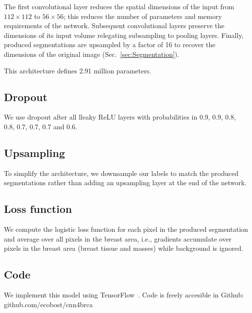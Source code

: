 	The first convolutional layer reduces the spatial dimensions of the input from $112 \times 112$ to $56 \times 56$; this reduces the number of parameters and memory requirements of the network. Subsequent convolutional layers preserve the dimensions of its input volume relegating subsampling to pooling layers. 
Finally, produced segmentations are upsampled by a factor of 16 to recover the dimensions of the original image (Sec.~\ref{sec:Segmentation}).

This architecture defines 2.91 million parameters. %



\subsection{Dropout}
We use dropout after all lleaky ReLU layers with probabilities in 0.9, 0.9, 0.8, 0.8, 0.7, 0.7, 0.7 and 0.6.

\subsection{Upsampling}
To simplify the architecture, we downsample our labels to match the produced segmentations rather than adding an upsampling layer at the end of the network.

\subsection{Loss function}
We compute the logistic loss function for each pixel in the produced segmentation and average over all pixels in the breast area, i.e., gradients accumulate over pixels in the breast area (breast tissue and masses) while background is ignored.

\subsection{Code}
We implement this model using TensorFlow~\cite{abadi2014}. Code is freely accesible in Github: github.com/ecobost/cnn4brca
